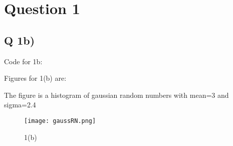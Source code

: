 \section{Question 1}

\subsection{Q 1b)}
Code for 1b:


Figures for 1(b) are:

The figure is a histogram of gaussian random numbers with mean=3 and sigma=2.4

\begin{figure}[h!]
  \centering
  \texttt{[image: gaussRN.png]}
  \caption{1(b)}
  \label{fig:fig1}
\end{figure}
